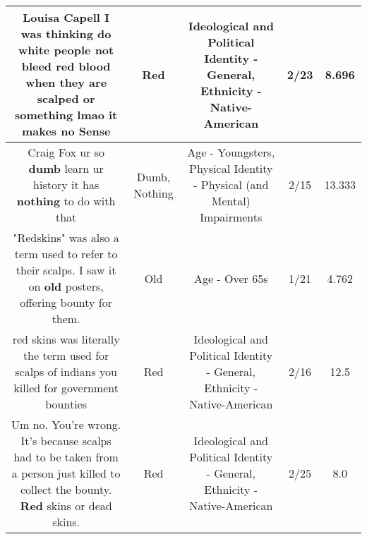 \documentclass[11pt]{article}
\newlength\mylength
\begin{document}
\begin{center}
\begin{longtable}{|C{.65\mylength}|C{.30\mylength}|C{.12\mylength}|C{.12\mylength}|C{.12\mylength}|}
  \small Louisa Capell I was thinking do white people not bleed \textbf{r\textbf{ed}} blood when they are scalped or something lmao it makes no Sense\normalsize   & Red &  Ideological and Political Identity - General, Ethnicity - Native-American & 2/23 & 8.696 \\  \hline
  \small Craig Fox ur so \textbf{dumb} learn ur history it has \textbf{nothing} to do with that\normalsize   & Dumb, Nothing & Age - Youngsters, Physical Identity - Physical (and Mental) Impairments & 2/15 & 13.333 \\  \hline
  \small "Redskins" was also a term used to refer to their scalps. I saw it on \textbf{old} posters, offering bounty for them.\normalsize   & Old & Age - Over 65s & 1/21 & 4.762 \\  \hline
  \small red skins was literally the term used for scalps of indians you killed for government bounties\normalsize   & Red &  Ideological and Political Identity - General, Ethnicity - Native-American & 2/16 & 12.5 \\  \hline
  \small Um no. You're wrong.  It's because scalps had to be taken from a person just killed to collect the bounty.  \textbf{R\textbf{ed}} skins or dead skins.\normalsize   & Red &  Ideological and Political Identity - General, Ethnicity - Native-American & 2/25 & 8.0 \\  \hline

\end{longtable}
\end{center}
\end{document}
